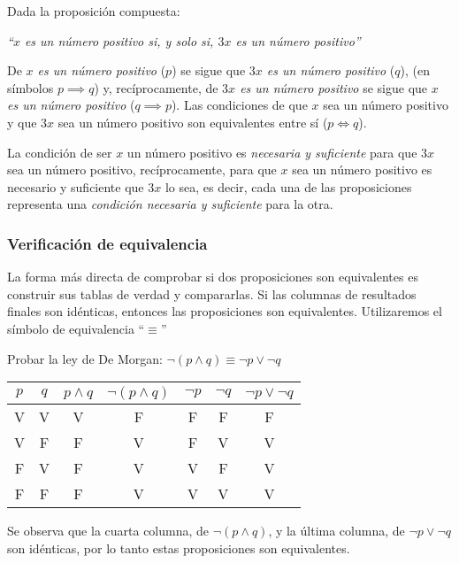 \begin{fmd-example}
	Dada la proposición compuesta:
	\begin{center}
		\emph{``$x$ es un número positivo si, y solo si, $3x$ es un número positivo''}
	\end{center}
	
	De \textit{$x$ es un número positivo} ($p$) se sigue que \textit{$3x$ es un número positivo} ($q$), (en símbolos $p \implies q$) y, recíprocamente, de \textit{$3x$ es un número positivo} se sigue que \textit{$x$ es un número positivo} ($q \implies p$). Las condiciones de que $x$ sea un número positivo y que $3x$ sea un número positivo son equivalentes entre sí ($p \iff q$).
	
	La condición de ser $x$ un número positivo es \textit{necesaria y suficiente} para que $3x$ sea un número positivo, recíprocamente, para que $x$ sea un número positivo es necesario y suficiente que $3x$ lo sea, es decir, cada una de las proposiciones representa una \textit{condición necesaria y suficiente} para la otra.
\end{fmd-example}

\subsubsection{Verificación de equivalencia}

La forma más directa de comprobar si dos proposiciones son equivalentes es construir sus tablas de verdad y compararlas. Si las columnas de resultados finales son idénticas, entonces las proposiciones son equivalentes. Utilizaremos el símbolo de equivalencia ``$\equiv$''

\begin{fmd-example}
	Probar la ley de De Morgan: \( \neg \left(p \land q \right) \equiv \neg p \lor \neg q \)
	\begin{table}[H]
		\centering
		\begin{tabular}{|c|c|c|c|c|c|c|}
			\hline
			$p$ & $q$ & $p \land q$ & $\neg (p \land q)$ & $\neg p$ & $\neg q$ & $\neg p \lor \neg q$ \\
			\hline
			V & V & V & F & F & F & F \\
			V & F & F & V & F & V & V \\
			F & V & F & V & V & F & V \\
			F & F & F & V & V & V & V \\
			\hline
		\end{tabular}
	\end{table}
	Se observa que la cuarta columna, de $\neg \left(p \land q \right)$, y la última columna, de \( \neg p \lor \neg q \) son idénticas, por lo tanto estas proposiciones son equivalentes.
\end{fmd-example}

